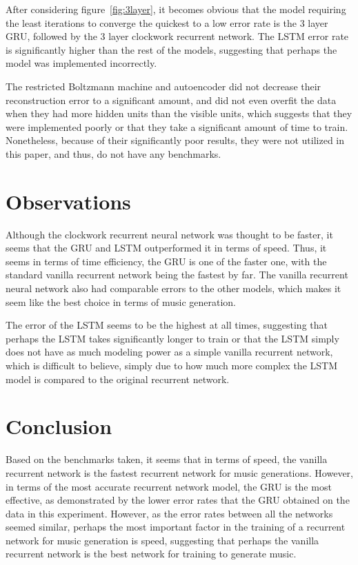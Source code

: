 \documentclass{article}
\begin{document}
After considering figure~\ref{fig:3layer}, it becomes obvious that the model
requiring the least iterations to converge the quickest to a low error rate is
the 3 layer GRU, followed by the 3 layer clockwork recurrent network. The LSTM
error rate is significantly higher than the rest of the models, suggesting that
perhaps the model was implemented incorrectly.

The restricted Boltzmann machine and autoencoder did not decrease their
reconstruction error to a significant amount, and did not even overfit the data
when they had more hidden units than the visible units, which suggests that they
were implemented poorly or that they take a significant amount of time to train.
Nonetheless, because of their significantly poor results, they were not utilized
in this paper, and thus, do not have any benchmarks.

\section{Observations}
Although the clockwork recurrent neural network was thought to be faster, it
seems that the GRU and LSTM outperformed it in terms of speed. Thus, it seems in
terms of time efficiency, the GRU is one of the faster one, with the standard
vanilla recurrent network being the fastest by far. The vanilla recurrent neural
network also had comparable errors to the other models, which makes it seem like
the best choice in terms of music generation.

The error of the LSTM seems to be the highest at all times, suggesting that
perhaps the LSTM takes significantly longer to train or that the LSTM simply
does not have as much modeling power as a simple vanilla recurrent network,
which is difficult to believe, simply due to how much more complex the LSTM
model is compared to the original recurrent network.

\section{Conclusion}
Based on the benchmarks taken, it seems that in terms of speed, the vanilla
recurrent network is the fastest recurrent network for music generations.
However, in terms of the most accurate recurrent network model, the GRU is the
most effective, as demonstrated by the lower error rates that the GRU obtained
on the data in this experiment. However, as the error rates between all the
networks seemed similar, perhaps the most important factor in the training of a
recurrent network for music generation is speed, suggesting that perhaps the
vanilla recurrent network is the best network for training to generate music.
\end{document}
